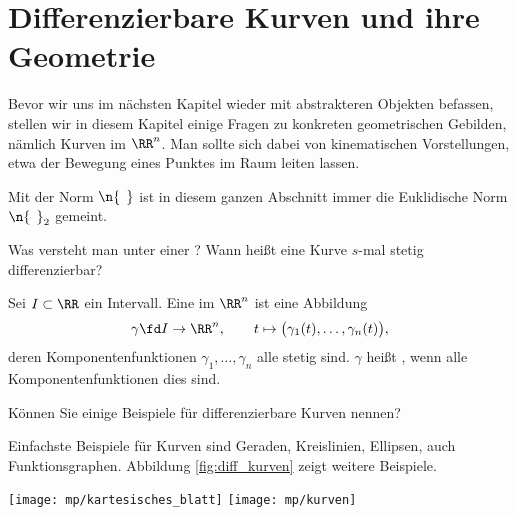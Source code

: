   \section{Differenzierbare Kurven und ihre Geometrie}

  Bevor wir uns im nächsten Kapitel wieder mit abstrakteren Objekten  
  befassen, stellen wir in diesem Kapitel einige Fragen zu konkreten 
  geometrischen Gebilden, nämlich Kurven im $\RR^n$. Man sollte sich 
  dabei von kinematischen Vorstellungen, etwa der 
  Bewegung eines Punktes im Raum leiten lassen.

  Mit der Norm $\n{\,\;}$ ist in diesem ganzen Abschnitt 
  immer die Euklidische Norm $\n{\,\;}_2$ gemeint. 

  \begin{frage}
    Was versteht man unter einer ? 
    Wann heißt eine Kurve $s$-mal stetig differenzierbar?
  \end{frage}

  \begin{antwort}
    Sei $I\subset\RR$ 
    ein Intervall. Eine  
    im $\RR^n$ ist eine Abbildung 
    \[
    \gamma\fd I \to\RR^n,\qquad t\mapsto 
    \big( \gamma_1(t), \ldots, \gamma_n(t) \big),
    \]
    deren Komponentenfunktionen $\gamma_1,\ldots,\gamma_n$ 
    alle stetig sind. $\gamma$ heißt  
    , wenn alle Komponentenfunktionen 
    dies sind. \AntEnd
  \end{antwort}

  \begin{frage}
    Können Sie einige Beispiele für differenzierbare Kurven nennen?
  \end{frage} 

  \begin{antwort}
    Einfachste Beispiele für Kurven sind Geraden, Kreislinien, Ellipsen, 
    auch Funktionsgraphen. Abbildung \ref{fig:diff_kurven} 
    zeigt weitere Beispiele. 

    \begin{center}
      \begin{minipage}{\textwidth}
        \texttt{[image: mp/kartesisches\_blatt]}
        \texttt{[image: mp/kurven]}
      \end{minipage}
      \label{fig:diff_kurven}
    \end{center}

    \AntEnd
  \end{antwort} 

